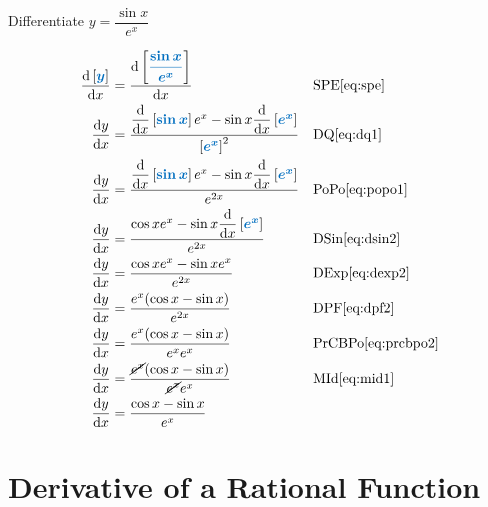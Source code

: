 \documentclass[20150903-160354-rs2.2-MarksMathNotebook.tex]{subfiles}
\begin{document}
\begin{example}[id:20151015-165037] \label{20151015-165037} \hfill \\
Differentiate $y=\dfrac{\sin x}{e^x}$

\soln

\solnsteps
\begin{align*}
\dfrac{\dd \farg{y}}{\dx} &= \dfrac{\dd \farg{\dfrac{\sin x}{e^x}}}{\dx} && \text{SPE} \eqref{eq:spe} \\
\dydx &= \dfrac{\ddx \farg{\sin x} e^x - \sin x \ddx \farg{e^x}}{\farg{e^x}^2} && \text{DQ} \eqref{eq:dq1}\\
\dydx &= \dfrac{\ddx \farg{\sin x} e^x - \sin x \ddx \farg{e^x}}{e^{2x}} && \text{PoPo} \eqref{eq:popo1} \\
\dydx &= \dfrac{\cos x e^x - \sin x \ddx \farg{e^x}}{e^{2x}} && \text{DSin} \eqref{eq:dsin2} \\
\dydx &= \dfrac{\cos x e^x - \sin x e^x}{e^{2x}} && \text{DExp} \eqref{eq:dexp2} \\
\dydx &= \dfrac{e^x (\cos x - \sin x)}{e^{2x}} && \text{DPF} \eqref{eq:dpf2} \\
\dydx &= \dfrac{e^x (\cos x - \sin x)}{e^xe^x} && \text{PrCBPo} \eqref{eq:prcbpo2} \\
\dydx &= \dfrac{\cancel{e^x} (\cos x - \sin x)}{\cancel{e^x}e^x} && \text{MId} \eqref{eq:mid1} \\
\dydx &= \dfrac{\cos x - \sin x}{e^x}
\end{align*}
\end{example}


\section{Derivative of a Rational Function}\label{Derivative of a Rational Function}
\end{document}
